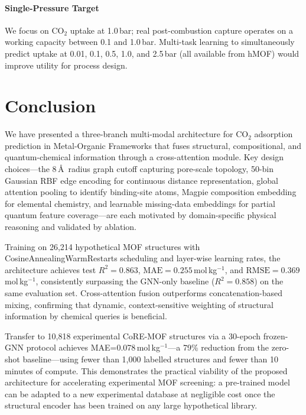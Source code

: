 \documentclass[conference]{IEEEtran}
\begin{document}
\paragraph{Single-Pressure Target}
We focus on CO$_2$ uptake at 1.0\,bar; real post-combustion capture operates
on a working capacity between 0.1 and 1.0\,bar.  Multi-task learning to
simultaneously predict uptake at 0.01, 0.1, 0.5, 1.0, and 2.5\,bar
(all available from hMOF) would improve utility for process design.

\section{Conclusion}
\label{sec:conclusion}

We have presented a three-branch multi-modal architecture for CO$_2$
adsorption prediction in Metal-Organic Frameworks that fuses structural,
compositional, and quantum-chemical information through a cross-attention
module.  Key design choices—the 8\,\AA\ radius graph cutoff capturing
pore-scale topology, 50-bin Gaussian RBF edge encoding for continuous
distance representation, global attention pooling to identify binding-site
atoms, Magpie composition embedding for elemental chemistry, and learnable
missing-data embeddings for partial quantum feature coverage—are each
motivated by domain-specific physical reasoning and validated by ablation.

Training on 26{,}214 hypothetical MOF structures with CosineAnnealingWarmRestarts
scheduling and layer-wise learning rates, the architecture achieves test
$R^2=0.863$, $\text{MAE}=0.255$\,mol\,kg$^{-1}$, and
$\text{RMSE}=0.369$\,mol\,kg$^{-1}$, consistently surpassing the
GNN-only baseline ($R^2=0.858$) on the same evaluation set.  Cross-attention
fusion outperforms concatenation-based mixing, confirming that dynamic,
context-sensitive weighting of structural information by chemical queries
is beneficial.

Transfer to 10{,}818 experimental CoRE-MOF structures via a 30-epoch
frozen-GNN protocol achieves MAE=0.078\,mol\,kg$^{-1}$—a 79\% reduction
from the zero-shot baseline—using fewer than 1{,}000 labelled structures and
fewer than 10\,minutes of compute.  This demonstrates the practical viability
of the proposed architecture for accelerating experimental MOF screening:
a pre-trained model can be adapted to a new experimental database at
negligible cost once the structural encoder has been trained on any large
hypothetical library.



\end{document}
